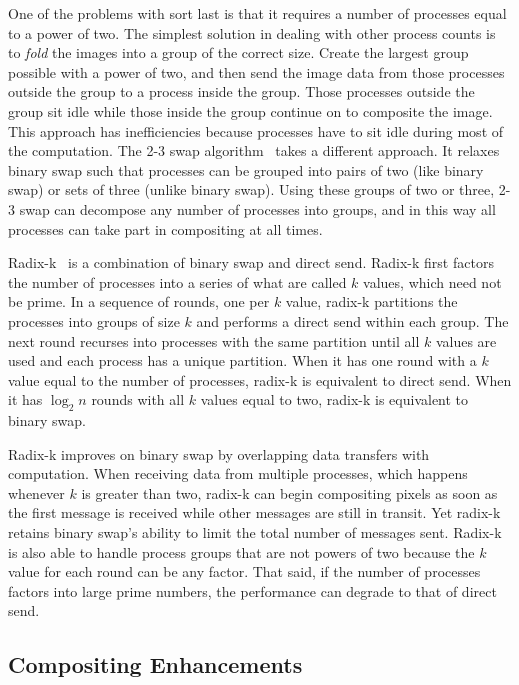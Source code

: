 \documentclass{vgtc}                          %
\newcommand*{\lcite}[1]{~\cite{#1}}
\newcommand*{\keyterm}[1]{\emph{#1}}
\begin{document}
One of the problems with sort last is that it requires a number of
processes equal to a power of two.  The simplest solution in dealing with
other process counts is to \keyterm{fold} the images into a group of the
correct size.  Create the largest group possible with a power of two, and
then send the image data from those processes outside the group to a
process inside the group.  Those processes outside the group sit idle while
those inside the group continue on to composite the image.  This approach
has inefficiencies because processes have to sit idle during most of the
computation.  The 2-3 swap algorithm\lcite{23Swap} takes a different
approach.  It relaxes binary swap such that processes can be grouped into
pairs of two (like binary swap) or sets of three (unlike binary swap).
Using these groups of two or three, 2-3 swap can decompose any number of
processes into groups, and in this way all processes can take part in
compositing at all times.

Radix-k\lcite{RadixK} is a combination of binary swap and direct send.
Radix-k first factors the number of processes into a series of what are
called $k$ values, which need not be prime.  In a sequence of rounds, one
per $k$ value, radix-k partitions the processes into groups of size $k$ and
performs a direct send within each group.  The next round recurses into
processes with the same partition until all $k$ values are used and each
process has a unique partition.  When it has one round with a $k$ value
equal to the number of processes, radix-k is equivalent to direct send.
When it has $\log_{2} n$ rounds with all $k$ values equal to two, radix-k
is equivalent to binary swap.

Radix-k improves on binary swap by overlapping data transfers with
computation.  When receiving data from multiple processes, which happens
whenever $k$ is greater than two, radix-k can begin compositing pixels as
soon as the first message is received while other messages are still in
transit.  Yet radix-k retains binary swap's ability to limit the total
number of messages sent.  Radix-k is also able to handle process groups
that are not powers of two because the $k$ value for each round can be any
factor.  That said, if the number of processes factors into large prime
numbers, the performance can degrade to that of direct send.

\subsection{Compositing Enhancements}
\label{sec:CompositingEnhancements}
\end{document}
